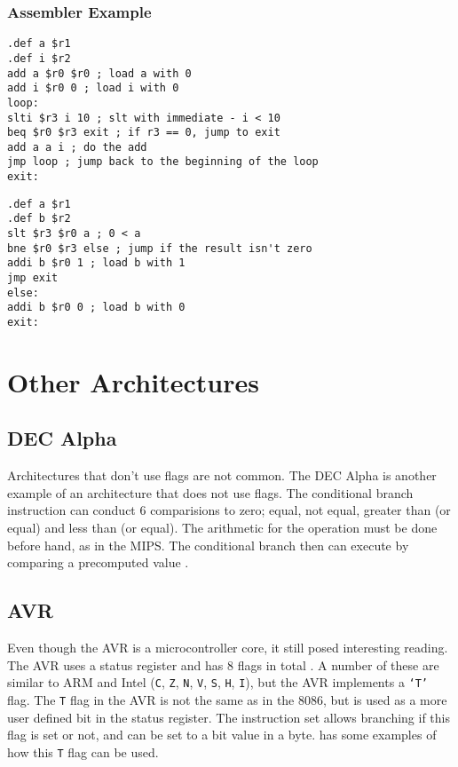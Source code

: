 \documentclass[12pt,a4paper]{article}
\begin{document}
\begin{bibunit}[is-unsrt]
\subsubsection{Assembler Example}
\begin{lstlisting}[frame=single,caption=MIPS assembler for listing \ref{ListC},label=mips1]
.def a $r1
.def i $r2
add a $r0 $r0 ; load a with 0
add i $r0 0 ; load i with 0
loop:
slti $r3 i 10 ; slt with immediate - i < 10
beq $r0 $r3 exit ; if r3 == 0, jump to exit
add a a i ; do the add
jmp loop ; jump back to the beginning of the loop
exit:
\end{lstlisting}
\begin{lstlisting}[frame=single,caption=MIPS assembler for listing \ref{ListC2},label=mips2]
.def a $r1
.def b $r2
slt $r3 $r0 a ; 0 < a
bne $r0 $r3 else ; jump if the result isn't zero
addi b $r0 1 ; load b with 1
jmp exit
else:
addi b $r0 0 ; load b with 0
exit:
\end{lstlisting}

\section{Other Architectures}
\subsection{DEC Alpha}

Architectures that don't use flags are not common. 
The DEC Alpha is another example of an architecture that does not use flags.
The conditional branch instruction can conduct 6 comparisions to zero; equal, not equal, greater than (or equal) and less than (or equal).
The arithmetic for the operation must be done before hand, as in the MIPS.
The conditional branch then can execute by comparing a precomputed value \cite{decalpha}. 


\subsection{AVR}
Even though the AVR is a microcontroller core, it still posed interesting reading. 
The AVR uses a status register and has 8 flags in total \cite{atmel:instructions}.
A number of these are similar to ARM and Intel (\texttt{C}, \texttt{Z}, \texttt{N}, \texttt{V}, \texttt{S}, \texttt{H}, \texttt{I}), but the AVR implements a \texttt{`T'} flag.
The \texttt{T} flag in the AVR is not the same as in the 8086, but is used as a more user defined bit in the status register.
The instruction set allows branching if this flag is set or not, and can be set to a bit value in a byte. 
\cite{avr:asm} has some examples of how this \texttt{T} flag can be used.



\end{bibunit}
\end{document}
